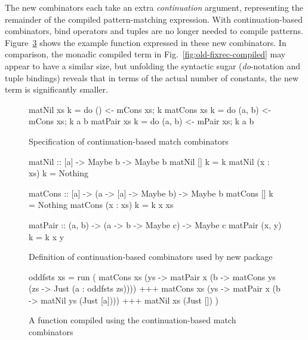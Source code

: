 The new combinators each take an extra \emph{continuation} argument, representing the remainder of the compiled pattern-matching expression. With continuation-based combinators, bind operators and tuples are no longer needed to compile patterns. Figure~\ref{fig:new-fixrec-compiled} shows the example function  expressed in these new combinators. In comparison, the monadic compiled term in Fig.~\ref{fig:old-fixrec-compiled} may appear to have a similar size, but unfolding the syntactic sugar (\emph{do}-notation and tuple bindings) reveals that in terms of the actual number of constants, the new term is significantly smaller.

\begin{figure}
\begin{hscode}
matNil xs k = do { () <- mCons xs; k }
matCons xs k = do { (a, b) <- mCons xs; k a b }
matPair xs k = do { (a, b) <- mPair xs; k a b }
\end{hscode}
\caption{Specification of continuation-based match combinators}
\label{fig:new-fixrec-combinators-spec}
\end{figure}

\begin{figure}
\begin{hscode}
matNil :: [a] -> Maybe b -> Maybe b
matNil [] k = k
matNil (x : xs) k = Nothing
\end{hscode}
\begin{hscode}
matCons :: [a] -> (a -> [a] -> Maybe b) -> Maybe b
matCons [] k = Nothing
matCons (x : xs) k = k x xs
\end{hscode}
\begin{hscode}
matPair :: (a, b) -> (a -> b -> Maybe c) -> Maybe c
matPair (x, y) k = k x y
\end{hscode}
\caption{Definition of continuation-based combinators used by new {\fixrec} package}
\label{fig:new-fixrec-combinators}
\end{figure}

\begin{figure}
\begin{hscode}
oddfsts xs = run (
  matCons xs (\x ys -> matPair x (\a b ->
    matCons ys (\y zs -> Just (a : oddfsts zs))))
  +++
  matCons xs (\x ys -> matPair x (\a b -> matNil ys (Just [a])))
  +++
  matNil xs (Just []) )
\end{hscode}
\caption{A function compiled using the continuation-based match combinators}
\label{fig:new-fixrec-compiled}
\end{figure}

